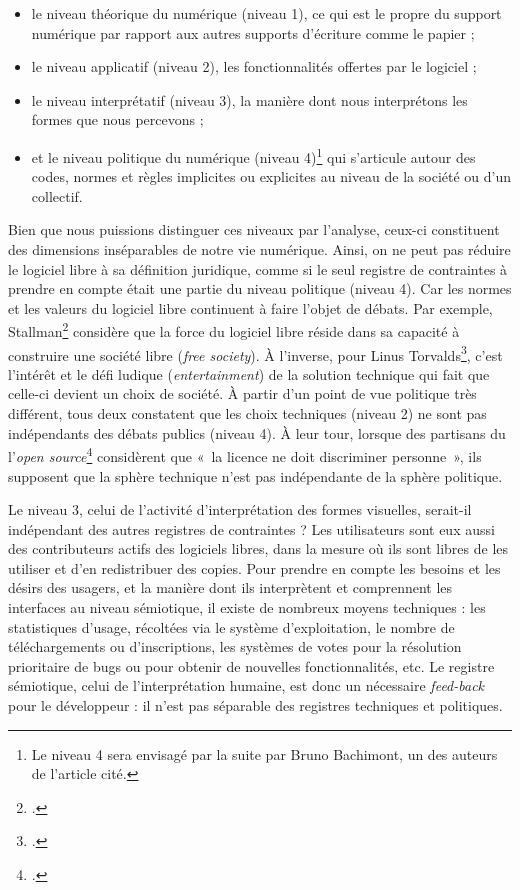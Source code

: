 \documentclass{FramateX}
\begin{document}
\begin{refsection}
\begin{itemize}
\item le niveau théorique du numérique (niveau 1), ce qui est le propre
du support numérique par rapport aux autres supports d'écriture comme
le papier ;
\item le niveau applicatif (niveau 2), les fonctionnalités offertes par
le logiciel ; 
\item le niveau interprétatif (niveau 3), la manière dont nous
interprétons les formes que nous percevons ; 
\item et le niveau politique du numérique (niveau 4)\footnote{Le niveau 4 sera envisagé par la suite par Bruno Bachimont, un des auteurs de l'article cité. } qui s'articule
autour des codes, normes et règles implicites ou explicites au niveau
de la société ou d'un collectif.
\end{itemize}

Bien que nous puissions distinguer ces niveaux par l'analyse, ceux-ci
constituent des dimensions inséparables de notre vie numérique. Ainsi,
on ne peut pas réduire le logiciel libre à sa définition juridique,
comme si le seul registre de contraintes à prendre en compte était une
partie du niveau politique (niveau 4). Car les normes et les valeurs du
logiciel libre continuent à faire l'objet de débats. Par exemple,
Stallman\footnote{\cite{stallmanfree2002}.} considère que la force du logiciel
libre réside dans sa capacité à construire une société libre
(\textit{free society}). À l'inverse, pour Linus Torvalds\footnote{\cite{torvaldil2001}.}, c'est l'intérêt et le défi ludique
(\textit{entertainment}) de la solution technique qui fait que celle-ci
devient un choix de société. À partir d'un point de vue politique très
différent, tous deux constatent que les choix techniques (niveau 2) ne
sont pas indépendants des débats publics (niveau 4). À leur tour,
lorsque des partisans du l'\textit{open source}\footnote{\cite{dibonaopen1999-1}.}
considèrent que «~la licence ne doit discriminer personne~», ils
supposent que la sphère technique n'est pas indépendante de la sphère
politique.

Le niveau 3, celui de l'activité d'interprétation des formes visuelles,
serait-il indépendant des autres registres de contraintes ? Les
utilisateurs sont eux aussi des contributeurs actifs des logiciels
libres, dans la mesure où ils sont libres de les utiliser et d'en
redistribuer des copies. Pour prendre en compte les besoins et les
désirs des usagers, et la manière dont ils interprètent et comprennent
les interfaces au niveau sémiotique, il existe de nombreux moyens
techniques : les statistiques d'usage, récoltées via le système
d'exploitation, le nombre de téléchargements ou d'inscriptions, les
systèmes de votes pour la résolution prioritaire de bugs ou pour
obtenir de nouvelles fonctionnalités, etc. Le registre sémiotique,
celui de l'interprétation humaine, est donc un nécessaire
\textit{feed-back} pour le développeur : il n'est pas séparable
des registres techniques et politiques. 


\end{refsection}
\end{document}
